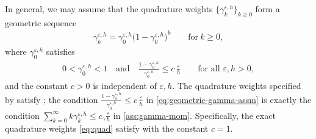 \documentclass[10pt]{amsart}
\theoremstyle{plain}
\theoremstyle{definition}
\numberwithin{equation}{section}
\newcommand{\eps}{{\varepsilon}}
\begin{document}
In general, we may assume that the quadrature weights $\{\gamma_k^{\eps,h}\}_{k\ge0}$ form a geometric sequence
\begin{align}\label{eq:geometric-gamma}
    \gamma_k^{\eps,h} = \gamma_0^{\eps,h}\big(1-\gamma_0^{\eps,h}\big)^k \qquad \text{for}\ k\geq0,
\end{align}
where $\gamma_0^{\eps,h}$ satisfies
\begin{align}\label{eq:geometric-gamma-assm}
    0 < \gamma_0^{\eps,h} <1 \quad \text{and} \quad \frac{1-\gamma_0^{\eps,h}}{\gamma_0^{\eps,h}} \leq c\,\frac{\eps}{h} \qquad \text{for all }  \eps,h>0,
\end{align}
and the constant $c>0$ is independent of $\eps,h$.
The quadrature weights specified by  satisfy ; the condition $\frac{1-\gamma_0^{\eps,h}}{\gamma_0^{\eps,h}} \leq c\,\frac{\eps}{h}$ in \cref{eq:geometric-gamma-assm} is exactly the condition $\sum_{k=0}^{\infty} k \gamma_k^{\eps,h} \leq c_\gamma \frac{\eps}h$ in \cref{ass:gamma-mom}. Specifically, the exact quadrature weights \cref{eq:quad} satisfy  with the constant $c=1$.
\end{document}
